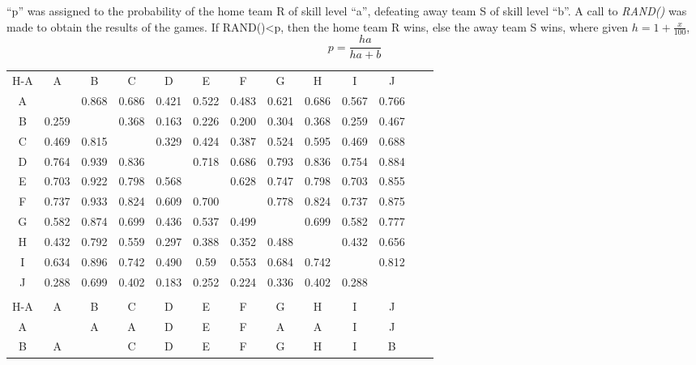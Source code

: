 \documentclass[12pt]{article}
\begin{document}
“p” was assigned to the probability of the home team R of skill level “a”, defeating away team S of skill level “b”. A call to \emph{RAND()} was made to obtain the results of the games. If RAND()\textless p, then the home team R wins, else the away team S wins, where given $h=1+\frac{x}{100}$, $$p=\frac{ha}{ha+b}$$ 

\begin{table}[h]
\centering
\begin{tabular}{ccccccccccccc}
H-A   & A     & B     & C     & D     & E     & F     & G     & H     & I     & J     &  &          \\
A     &       & 0.868 & 0.686 & 0.421 & 0.522 & 0.483 & 0.621 & 0.686 & 0.567 & 0.766 &  &          \\
B     & 0.259 &       & 0.368 & 0.163 & 0.226 & 0.200 & 0.304 & 0.368 & 0.259 & 0.467 &  &          \\
C     & 0.469 & 0.815 &       & 0.329 & 0.424 & 0.387 & 0.524 & 0.595 & 0.469 & 0.688 &  &          \\
D     & 0.764 & 0.939 & 0.836 &       & 0.718 & 0.686 & 0.793 & 0.836 & 0.754 & 0.884 &  &          \\
E     & 0.703 & 0.922 & 0.798 & 0.568 &       & 0.628 & 0.747 & 0.798 & 0.703 & 0.855 &  &          \\
F     & 0.737 & 0.933 & 0.824 & 0.609 & 0.700 &       & 0.778 & 0.824 & 0.737 & 0.875 &  &          \\
G     & 0.582 & 0.874 & 0.699 & 0.436 & 0.537 & 0.499 &       & 0.699 & 0.582 & 0.777 &  &          \\
H     & 0.432 & 0.792 & 0.559 & 0.297 & 0.388 & 0.352 & 0.488 &       & 0.432 & 0.656 &  &          \\
I     & 0.634 & 0.896 & 0.742 & 0.490 & 0.59  & 0.553 & 0.684 & 0.742 &       & 0.812 &  &          \\
J     & 0.288 & 0.699 & 0.402 & 0.183 & 0.252 & 0.224 & 0.336 & 0.402 & 0.288 &       &  &          \\
      &       &       &       &       &       &       &       &       &       &       &  &          \\
H-A   & A     & B     & C     & D     & E     & F     & G     & H     & I     & J     &  &          \\
A     &       & A     & A     & D     & E     & F     & A     & A     & I     & J     &  &          \\
B     & A     &       & C     & D     & E     & F     & G     & H     & I     & B     &  &          \\

\end{tabular}
\end{table}
\end{document}
